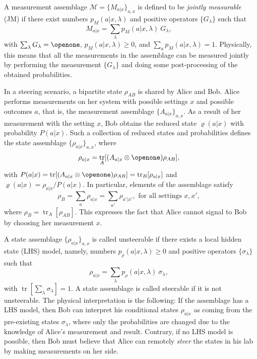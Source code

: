 \documentclass[10pt,twocolumn,aps,prl,nobibnotes,showpacs,superscriptaddress,floatfix]{revtex4-1}
\DeclareMathOperator{\tr}{tr}
\theoremstyle{definition}
\begin{document}
A measurement assemblage $\mathcal{M}=\{M_{a|x}\}_{a,x}$ is defined to be {\it jointly measurable} (JM) \cite{Alietal09} if there exist numbers $p_M(a|x,\lambda)$ and positive operators $\{ G_\lambda\}$ such that 
\begin{equation}\label{eq:JM}
M_{a|x} = \sum_\lambda p_M(a|x,\lambda)\ G_\lambda,
\end{equation}
with $\sum_\lambda G_\lambda =\openone$, $p_M(a|x,\lambda)\geq 0$, and $\sum_a p_M(a|x,\lambda) =1$. Physically, this means that all the measurements in the 
assemblage can be measured jointly by performing the measurement $\{G_\lambda\}$
and doing some post-processing of the obtained probabilities. 

  
In a steering scenario, a bipartite state $\rho_{AB}$ is shared by Alice and Bob.
Alice performs measurements on her system with possible settings $x$ and possible outcomes $a$, that is, the measurement assemblage $\{ A_{a|x}\}_{a,x}$. As a result of her measurement with the setting $x$, Bob obtains the reduced state $\varrho(a|x)$ with probability $P(a|x)$. Such a collection of reduced states and probabilities defines the state assemblage $\{\rho_{a|x}\}_{a,x}$, where
\begin{equation}
\rho_{a|x} = \tr_A[(A_{a|x}\otimes \openone) \rho_{AB}],
\end{equation}
with $P(a|x)= \tr [(A_{a|x}\otimes \openone) \rho_{AB}]=\tr_B[\rho_{a|x}]$ and $\varrho(a|x) = \rho_{a|x}/ P(a|x)$.
In particular, elements of the assemblage satisfy
\begin{equation}\label{redu}
\rho_B = \sum_a \rho_{a|x} = \sum_{a'} \rho_{a'|x'}, \text{ for all settings } x,x',
\end{equation}
where $\rho_B=\tr_A [\rho_{AB}]$. This expresses the fact that
Alice cannot signal to Bob by choosing her measurement $x$.

A state assemblage $\{\rho_{a|x}\}_{a,x}$ is called unsteerable if there exists a local hidden state (LHS) model, namely, numbers 
$p_\rho(a|x,\lambda)\geq 0$ and positive operators $\{ \sigma_\lambda\}$  such that
\begin{equation}\label{eq:LHS}
\rho_{a|x} = \sum_\lambda p_\rho(a|x,\lambda)\ \sigma_\lambda,
\end{equation}
with $\tr[\sum_\lambda \sigma_\lambda]=1$. A state assemblage is called
steerable if it is not unsteerable. The physical interpretation is the 
following: If the assemblage has a LHS model, then Bob can interpret
his conditional states $\rho_{a|x}$ as coming from the pre-existing states
$\sigma_\lambda$, where only the probabilities are changed due to the knowledge
of Alice's measurement and result. Contrary, if no LHS model is possible, 
then Bob must believe that Alice can remotely {\it steer} the states in his 
lab by making measurements on her side.
\end{document}
